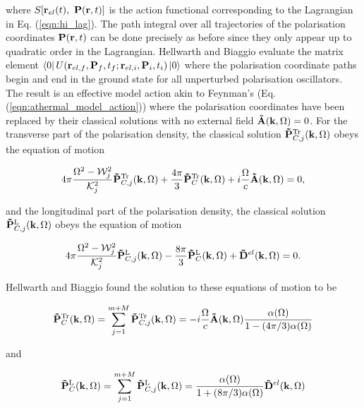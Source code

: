 where $S[\vb{r}_{el}(t),\ \vb{P}(\vb{r}, t)]$ is the action functional corresponding to the Lagrangian in Eq. (\ref{eqn:hi_lag}). The path integral over all trajectories of the polarisation coordinates $\vb{P}(\vb{r}, t)$ can be done precisely as before since they only appear up to quadratic order in the Lagrangian. Hellwarth and Biaggio evaluate the matrix element $\bra{0} U(\vb{r}_{el, f}, \vb{P}_f, t_f; \vb{r}_{el, i}, \vb{P}_i, t_i) \ket{0}$ where the polarisation coordinate paths begin and end in the ground state for all unperturbed polarisation oscillators. The result is an effective model action akin to Feynman's (Eq. (\ref{eqn:athermal_model_action})) where the polarisation coordinates have been replaced by their classical solutions with no external field $\vb{\Tilde{A}}(\vb{k}, \Omega) = 0$. For the transverse part of the polarisation density, the classical solution $\vb{\Tilde{P}}^{\text{Tr}}_{C, j}(\vb{k}, \Omega)$ obeys the equation of motion

\begin{equation}
    4\pi \frac{\Omega^2 - \mathcal{W}_j^2}{\mathcal{K}_j^2} \vb{\Tilde{P}}^{\text{Tr}}_{C, j}(\vb{k}, \Omega) + \frac{4\pi}{3} \vb{\Tilde{P}}^{\text{Tr}}_{C}(\vb{k}, \Omega) + i \frac{\Omega}{c} \vb{\Tilde{A}}(\vb{k}, \Omega) = 0,
\end{equation}

and the longitudinal part of the polarisation density, the classical solution $\vb{\Tilde{P}}^{\text{L}}_{C, j}(\vb{k}, \Omega)$ obeys the equation of motion

\begin{equation}
    4\pi \frac{\Omega^2 - \mathcal{W}_j^2}{\mathcal{K}_j^2} \vb{\Tilde{P}}^{\text{L}}_{C, j}(\vb{k}, \Omega) - \frac{8\pi}{3} \vb{\Tilde{P}}^{\text{L}}_{C}(\vb{k}, \Omega) + \vb{\Tilde{D}}^{el}(\vb{k}, \Omega) = 0.
\end{equation}

Hellwarth and Biaggio found the solution to these equations of motion to be

\begin{equation} \label{eqn:tr_sol}
    \vb{\Tilde{P}}^{\text{Tr}}_{C}(\vb{k}, \Omega) = \sum_{j = 1}^{m+M} \vb{\Tilde{P}}^{\text{Tr}}_{C, j}(\vb{k}, \Omega) = -i \frac{\Omega}{c} \vb{\Tilde{A}}(\vb{k}, \Omega) \frac{\alpha(\Omega)}{1 - (4\pi / 3) \alpha(\Omega)}
\end{equation}

and

\begin{equation}
    \vb{\Tilde{P}}^{\text{L}}_{C}(\vb{k}, \Omega) = \sum_{j = 1}^{m+M} \vb{\Tilde{P}}^{\text{L}}_{C, j}(\vb{k}, \Omega) = \frac{\alpha(\Omega)}{1 + (8\pi / 3) \alpha(\Omega)} \vb{\Tilde{D}}^{el}(\vb{k}, \Omega)
\end{equation}

